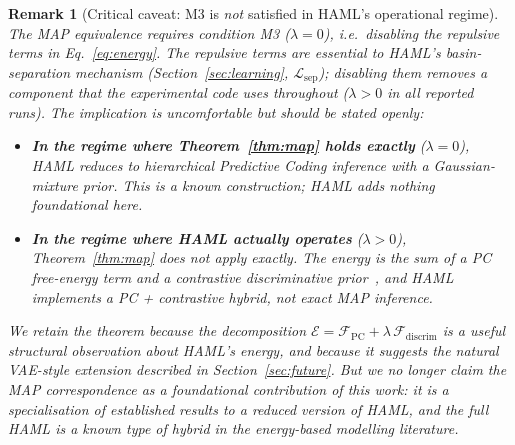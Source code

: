 \documentclass[11pt,a4paper]{article}
\newtheorem{remark}[theorem]{Remark}
\begin{document}
\begin{remark}[Critical caveat: M3 is \emph{not} satisfied in HAML's operational regime]
\label{rem:m3_not_satisfied}
The MAP equivalence requires condition M3 ($\lambda = 0$), i.e.\ \emph{disabling the
repulsive terms} in Eq.~\ref{eq:energy}. The repulsive terms are essential to HAML's
basin-separation mechanism (Section~\ref{sec:learning}, $\mathcal{L}_{\mathrm{sep}}$);
disabling them removes a component that the experimental code uses throughout
($\lambda > 0$ in all reported runs). The implication is uncomfortable but should be
stated openly:
\begin{itemize}
  \item \textbf{In the regime where Theorem~\ref{thm:map} holds exactly}
        ($\lambda = 0$), HAML reduces to hierarchical Predictive Coding inference
        with a Gaussian-mixture prior. This is a known construction; HAML adds
        nothing foundational here.
  \item \textbf{In the regime where HAML actually operates} ($\lambda > 0$),
        Theorem~\ref{thm:map} does not apply exactly. The energy is the sum of a PC
        free-energy term and a contrastive discriminative
        prior~\cite{larochelle2008}, and HAML implements a PC + contrastive hybrid,
        not exact MAP inference.
\end{itemize}
We retain the theorem because the decomposition
$\mathcal{E} = \mathcal{F}_{\mathrm{PC}} + \lambda\,\mathcal{F}_{\mathrm{discrim}}$
is a useful structural observation about HAML's energy, and because it suggests the
natural VAE-style extension described in Section~\ref{sec:future}. But we no longer
claim the MAP correspondence as a foundational contribution of this work: it is a
specialisation of established results to a reduced version of HAML, and the full HAML
is a known type of hybrid in the energy-based modelling literature.
\end{remark}
\end{document}
